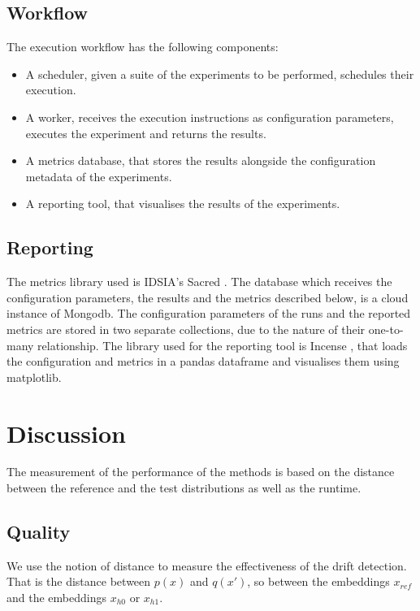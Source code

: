 \documentclass[12pt]{report}
\begin{document}
\section{Workflow}

The execution workflow has the following components:
\begin{itemize}
    \item A scheduler, given a suite of the experiments to be performed, schedules their execution.
    \item A worker, receives the execution instructions as configuration parameters, executes the experiment and returns the results.
    \item A metrics database, that stores the results alongside the configuration metadata of the experiments.
    \item A reporting tool, that visualises the results of the experiments.
\end{itemize}

\section{Reporting}

The metrics library used is IDSIA's Sacred \cite{klaus_greff-proc-scipy-2017}.
The database which receives the configuration parameters, the results and the metrics described below, is a cloud instance of Mongodb.
The configuration parameters of the runs and the reported metrics are stored in two separate collections, due to the nature of their one-to-many relationship.
The library used for the reporting tool is Incense \cite{buscheJarnoRFBIncense2022}, that loads the configuration and metrics in a pandas dataframe and visualises them using matplotlib.

\chapter{Discussion}

The measurement of the performance of the methods is based on the distance between the reference and the test distributions as well as the runtime.
\section{Quality}
We use the notion of distance to measure the effectiveness of the drift detection.
That is the distance between \(p(x)\) and \(q(x')\), so between the embeddings \(x_{ref}\) and the embeddings \(x_{h0}\) or \(x_{h1}\).
\end{document}
